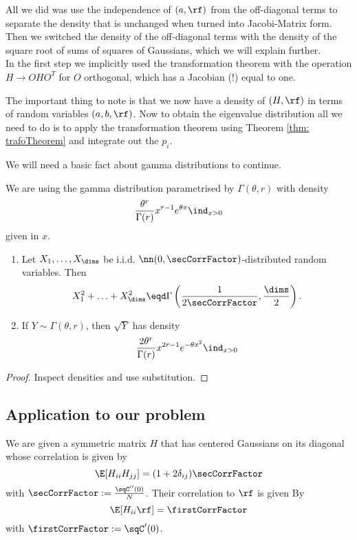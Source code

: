 All we did was use the independence of $(a,\rf)$ from the off-diagonal terms to separate the density that is unchanged when turned into Jacobi-Matrix form. Then we switched the density of the off-diagonal terms with the density of the square root of sums of squares of Gaussians, which we will explain further.\\
In the first step we implicitly used the transformation theorem with the operation $H \to OHO^T$ for $O$ orthogonal, which has a Jacobian (!) equal to one.

The important thing to note is that we now have a density of $(H,\rf)$ in terms of random variables $(a,b,\rf)$. Now to obtain the eigenvalue distribution all we need to do is to apply the transformation theorem using Theorem \ref{thm: trafoTheorem} and integrate out the $p_i$.

We will need a basic fact about gamma distributions to continue.

\begin{lemma}\label{lem: gammaFacts}
    We are using the gamma distribution parametrised by $\Gamma(\theta, r)$ with density
    $$ \frac{\theta^r}{\Gamma(r)} x^{r-1} e^{\theta x} \ind_{x>0}$$
    given in $x$.
    \begin{enumerate}
        \item Let $X_1, \ldots, X_\dims$ be i.i.d. $\nn(0,\secCorrFactor)$-distributed random        variables. Then 
            $$ X_1^2 + \ldots + X_\dims^2 \eqd \Gamma\left(\frac{1}{2\secCorrFactor}, \frac{\dims}{2}\right).$$

        \item If $Y \sim \Gamma(\theta, r)$, then $\sqrt{Y}$ has density
            $$ \frac{2\theta^r}{\Gamma(r)} x^{2r-1} e^{-\theta x^2} \ind_{x>0} $$
    \end{enumerate}
\end{lemma}
\begin{proof}
    Inspect densities and use substitution. 
\end{proof}



\subsection{Application to our problem}

We are given a symmetric matrix $H$ that has centered Gaussians on its diagonal whose correlation is given by 
$$  \E[H_{ii}H_{jj}] = (1+2\delta_{ij}) \secCorrFactor$$
with $\secCorrFactor := \frac{\sqC''(0)}{N}$. Their correlation to $\rf$ is given By
$$ \E[H_{ii} \rf] = \firstCorrFactor $$
with $\firstCorrFactor := \sqC'(0)$.

